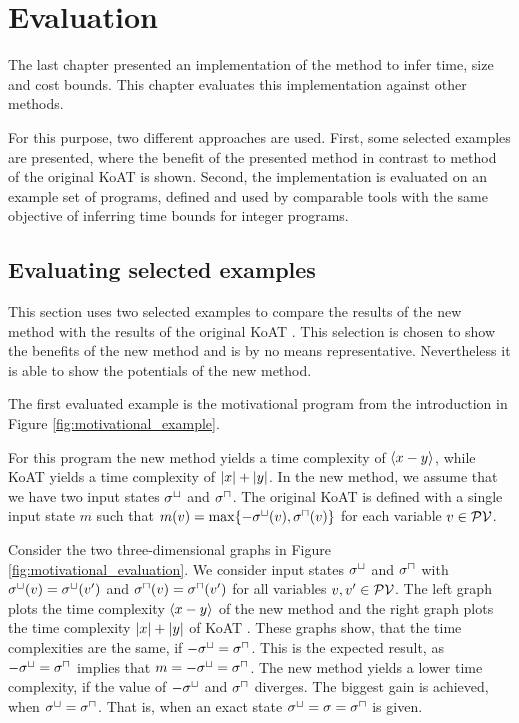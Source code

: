 \section{Evaluation}

The last chapter presented an implementation of the method to infer time, size and cost bounds.
This chapter evaluates this implementation against other methods.

For this purpose, two different approaches are used.
First, some selected examples are presented, where the benefit of the presented method in contrast to method of the original KoAT \cite{koat} is shown.
Second, the implementation is evaluated on an example set of programs, defined and used by comparable tools with the same objective of inferring time bounds for integer programs.

\subsection{Evaluating selected examples}

This section uses two selected examples to compare the results of the new method with the results of the original KoAT \cite{koat}.
This selection is chosen to show the benefits of the new method and is by no means representative.
Nevertheless it is able to show the potentials of the new method.

The first evaluated example is the motivational program from the introduction in Figure \ref{fig:motivational_example}.



For this program the new method yields a time complexity of $\langle x-y\rangle$, while KoAT \cite{koat} yields a time complexity of $\left|x\right|+\left|y\right|$.
In the new method, we assume that we have two input states ${\sigma^\sqcup}$ and ${\sigma^\sqcap}$.
The original KoAT is defined with a single input state $m$ such that $m(v) = \max \lbrace -{\sigma^\sqcup}(v),{\sigma^\sqcap}(v) \rbrace$ for each variable $v \in \mathcal{PV}$.

Consider the two three-dimensional graphs in Figure \ref{fig:motivational_evaluation}.
We consider input states ${\sigma^\sqcup}$ and ${\sigma^\sqcap}$ with ${\sigma^\sqcup}(v) = {\sigma^\sqcup}(v')$ and ${\sigma^\sqcap}(v) = {\sigma^\sqcap}(v')$ for all variables $v, v' \in \mathcal{PV}$.
The left graph plots the time complexity $\langle x-y\rangle$ of the new method and the right graph plots the time complexity $\left|x\right|+\left|y\right|$ of KoAT \cite{koat}.
These graphs show, that the time complexities are the same, if $-{\sigma^\sqcup} = {\sigma^\sqcap}$.
This is the expected result, as $-{\sigma^\sqcup} = {\sigma^\sqcap}$ implies that $m = -{\sigma^\sqcup} = {\sigma^\sqcap}$.
The new method yields a lower time complexity, if the value of $-{\sigma^\sqcup}$ and ${\sigma^\sqcap}$ diverges.
The biggest gain is achieved, when ${\sigma^\sqcup} = {\sigma^\sqcap}$.
That is, when an exact state ${\sigma^\sqcup} = \sigma = {\sigma^\sqcap}$ is given.

